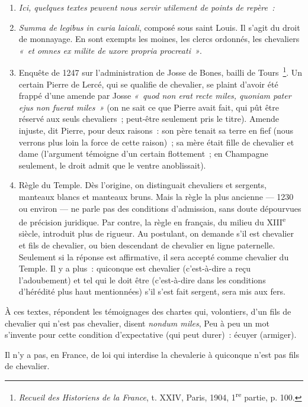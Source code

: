 \documentclass[french,twoside]{book} %
\newlength{\listmod}
\newcommand{\listhead}[1]{\hspace{-1\listmod}\emph{#1}}
\begin{document}
\begin{enumerate}[itemsep=0pt,]
\item[]\listhead{Ici, quelques textes peuvent nous servir utilement de points de repère :}
\item {\itshape Summa de legibus in curia laicali}, composé sous saint Louis. Il s’agit du droit de monnayage. En sont exempts les moines, les clercs ordonnés, les chevaliers \emph{« et omnes ex milite de uxore propria procreati »}.
\item Enquête de 1247 sur l’administration de Josse de Bones, bailli de Tours \footnote{{\itshape Recueil des Historiens de la France}, t. XXIV, Paris, 1904, 1\textsuperscript{re} partie, p. 100.}. Un certain Pierre de Lercé, qui se qualifie de chevalier, se plaint d’avoir été frappé d’une amende par Josse \emph{« quod non erat recte miles, quoniam pater ejus non fuerat miles »} (on ne sait ce que Pierre avait fait, qui pût être réservé aux seuls chevaliers ; peut-être seulement pris le titre). Amende injuste, dit Pierre, pour deux raisons : son père tenait sa terre en fief (nous verrons plus loin la force de cette raison) ; sa mère était fille de chevalier et dame (l’argument témoigne d’un certain flottement ; en Champagne seulement, le droit admit que le ventre anoblissait).
\item Règle du Temple. Dès l’origine, on distinguait chevaliers et sergents, manteaux blancs et manteaux bruns. Mais la règle la plus ancienne — 1230 ou environ — ne parle pas des conditions d’admission, sans doute dépourvues de précision juridique. Par contre, la règle en français, du milieu du XIII\textsuperscript{e} siècle, introduit plus de rigueur. Au postulant, on demande s’il est chevalier et fils de chevalier, ou bien descendant de chevalier en ligne paternelle. Seulement si la réponse est affirmative, il sera accepté comme chevalier du Temple. Il y a plus : quiconque est chevalier (c’est-à-dire a reçu l’adoubement) et tel qui le doit être (c’est-à-dire dans les conditions d’hérédité plus haut mentionnées) s’il s’est fait sergent, sera mis aux fers.
\end{enumerate}

\noindent À ces textes, répondent les témoignages des chartes qui, volontiers, d’un fils de chevalier qui n’est pas chevalier, disent \emph{nondum miles}, Peu à peu un mot s’invente pour cette condition d’expectative (qui peut durer) : écuyer (armiger).\par
Il n’y a pas, en France, de loi qui interdise la chevalerie à quiconque n’est pas fils de chevalier.\par
\end{document}
